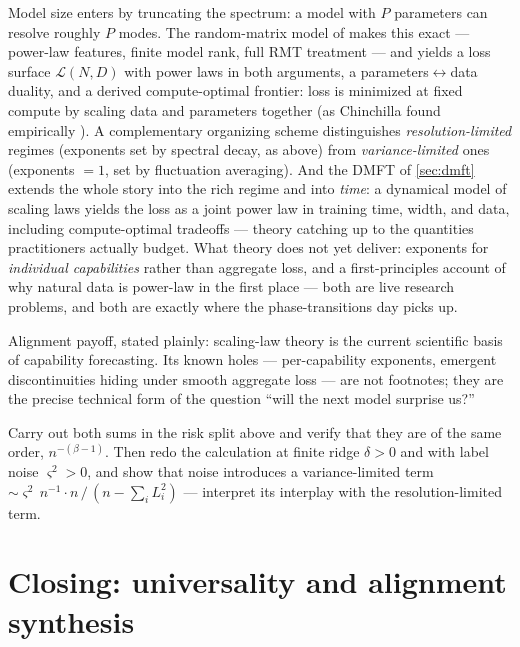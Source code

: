\documentclass[11pt]{article}
\begin{document}
Model size enters by truncating the spectrum: a model with $P$ parameters
can resolve roughly $P$ modes. The random-matrix model of
\cite{maloney2022solvable} makes this exact --- power-law features, finite
model rank, full RMT treatment --- and yields a loss surface
$\mathcal{L}(N, D)$ with power laws in both arguments, a
parameters$\leftrightarrow$data duality, and a derived compute-optimal
frontier: loss is minimized at fixed compute by scaling data and parameters
together (as Chinchilla found empirically \cite{hoffmann2022training}).
A complementary organizing scheme \cite{bahri2021explaining} distinguishes
\emph{resolution-limited} regimes (exponents set by spectral decay, as
above) from \emph{variance-limited} ones (exponents $= 1$, set by
fluctuation averaging). And the DMFT of \cref{sec:dmft} extends the whole
story into the rich regime and into \emph{time}: a dynamical model of
scaling laws \cite{bordelon2024dynamical} yields the loss as a joint power
law in training time, width, and data, including compute-optimal tradeoffs
--- theory catching up to the quantities practitioners actually budget.
What theory does not yet deliver: exponents for \emph{individual
capabilities} rather than aggregate loss, and a first-principles account of
why natural data is power-law in the first place --- both are live research
problems, and both are exactly where the phase-transitions day picks up.

\begin{callout}[note]
Alignment payoff, stated plainly: scaling-law theory is the current
scientific basis of capability forecasting. Its known holes ---
per-capability exponents, emergent discontinuities hiding under smooth
aggregate loss --- are not footnotes; they are the precise technical form of
the question ``will the next model surprise us?''
\end{callout}

\begin{exercise}
\label{ex:scaling}
Carry out both sums in the risk split above and verify that they are of the
same order, $n^{-(\beta-1)}$. Then redo the calculation at finite ridge
$\delta > 0$ and with label noise $\varsigma^2 > 0$, and show that noise
introduces a variance-limited term $\sim \varsigma^2\, n^{-1}\cdot
n\,/\,(n - \sum_i L_i^2)$ --- interpret its interplay with the
resolution-limited term.
\end{exercise}

\section{Closing: universality and alignment synthesis}
\label{sec:closing}
\end{document}
